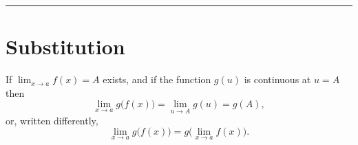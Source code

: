 \documentclass{amsproc}
\begin{document}
\noindent\rule{\textwidth}{1pt}

\section{Substitution}
If $\lim_{x\to a} f(x) = A$ exists, and if the function $g(u)$ is continuous at
$u=A$ then
\[
  \lim_{x\to a} g\bigl(f(x)\bigr) = \lim_{u\to A} g(u) = g(A),
\]
or, written differently,
\begin{equation}
  \lim_{x\to a} g\bigl(f(x)\bigr) = g\bigl(\lim_{x\to a} f(x)\bigr).
\end{equation}



\end{document}
